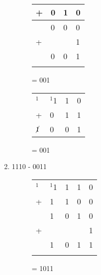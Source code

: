 \begin{enumerate}[label=(\alph*)]
\begin{figure}[H]
\begin{minipage}[t]{0.45\textwidth}
\begin{table}[H]
\begin{tabularx}{0.4\textwidth}{XXXX}
                + & 0& 1 & 0\\
                \hline
                & 0 & 0 & 0 \\
                + & & & 1\\
                \hline
                & 0 & 0 & 1\\
                \hline
                &  & \\
            \end{tabularx}
        \end{table}
        = 001
    \end{minipage}\hfill
    \begin{minipage}[t]{0.45\textwidth}
        \begin{table}[H]
            \begin{tabularx}{0.4\textwidth}{XXXX}
                $^1$& $^1$1 & 1 & 0\\
                + & 0 & 1 & 1\\
                \hline
                $\cancel{1}$ & 0 & 0 & 1 \\
                \hline
            \end{tabularx}
        \end{table}
        = 001
    \end{minipage}\hfill
\end{figure}
\item 1110 - 0011
\begin{figure}[H]
    \begin{minipage}[t]{0.45\textwidth}
        \begin{table}[H]
            \begin{tabularx}{0.5\textwidth}{XXXXX}
                $^1$& $^1$1& 1 & 1 & 0\\
                + & 1 & 1& 0 & 0\\
                \hline
                & 1 & 0 & 1 & 0 \\
                + & & & &  1\\
                \hline
                & 1 & 0 & 1 & 1\\
                \hline
                &  & \\
            \end{tabularx}
        \end{table}
        = 1011
    \end{minipage}\hfill
    \begin{minipage}[t]{0.45\textwidth}
        \begin{table}[H]

\end{table}
\end{minipage}
\end{figure}
\end{enumerate}

